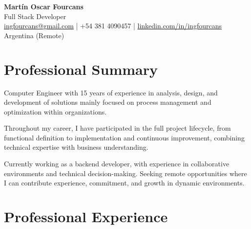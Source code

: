 \documentclass[10pt,a4paper]{article}
\begin{document}
\begin{center}
    {\LARGE \textbf{Martín Oscar Fourcans}} \\
    \vspace{2pt}
    Full Stack Developer \\
    \vspace{2pt}
    \href{mailto:ingfourcans@gmail.com}{ingfourcans@gmail.com} \quad | \quad 
    +54 381 4090457 \quad | \quad 
    \href{https://linkedin.com/in/ingfourcans}{linkedin.com/in/ingfourcans} \\
    Argentina (Remote)
\end{center}

\vspace{3pt}

\section*{Professional Summary}

Computer Engineer with 15 years of experience in analysis, design, and development of solutions mainly focused on process management and optimization within organizations.

Throughout my career, I have participated in the full project lifecycle, from functional definition to implementation and continuous improvement, combining technical expertise with business understanding.

Currently working as a backend developer, with experience in collaborative environments and technical decision-making. Seeking remote opportunities where I can contribute experience, commitment, and growth in dynamic environments.

\vspace{3pt}

\section*{Professional Experience}
\end{document}
